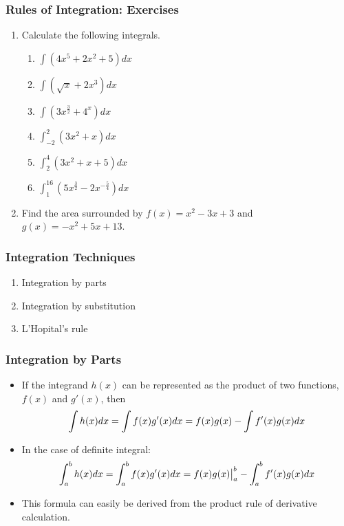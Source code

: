 \documentclass[pdflatex, 12pt]{beamer}
\begin{document}
\begin{frame}
\frametitle{Rules of Integration: Exercises}
\begin{enumerate}
\item Calculate the following integrals.
 \begin{enumerate}
 \item $\int (4x^5 + 2x^2 + 5)dx$
 \item $\int (\sqrt{x} + 2x^3)dx$
 \item $\int (3x^{\frac{3}{2}} + 4^{x})dx$
 \item $\int^2_{-2} (3x^2 + x)dx$
 \item $\int^4_2 (3x^2 + x + 5)dx$
 \item $\int^{16}_1 (5x^{\frac{3}{2}} - 2x^{-\frac{5}{4}})dx$
 \end{enumerate}
\vspace{0.4cm}
\item Find the area surrounded by $f(x) = x^2 - 3x + 3$ and $g(x) = -x^2 + 5x + 13$.
\end{enumerate}
\end{frame}

\begin{frame}
\frametitle{Integration Techniques}
\begin{enumerate}
\item Integration by parts
\vspace{0.4cm}
\item Integration by substitution
\vspace{0.4cm}
\item L'Hopital's rule
\end{enumerate}
\end{frame}

\begin{frame}
\frametitle{Integration by Parts}
\begin{itemize}
\item If the integrand $h(x)$ can be represented as the product of two functions, $f(x)$ and $g'(x)$, then 
 \begin{equation}
 \int h(x) dx = \int f(x)g'(x) dx = f(x)g(x) - \int f'(x)g(x) dx \notag
 \end{equation} 
\item In the case of definite integral:
 \begin{equation}
 \int^b_a h(x) dx = \int^b_a f(x)g'(x) dx = f(x)g(x)\big|^b_a - \int^b_a f'(x)g(x) dx \notag
 \end{equation} 
\item This formula can easily be derived from the product rule of derivative calculation.
\end{itemize}
\end{frame}
\end{document}
